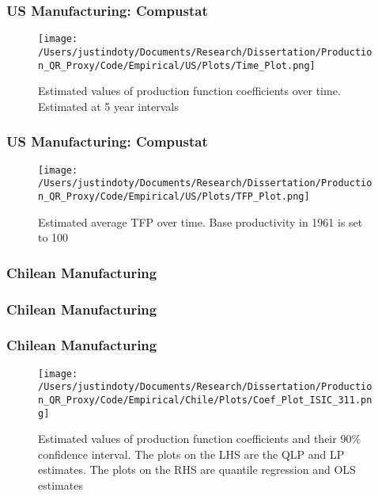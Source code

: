 \documentclass{beamer}
\begin{document}
\begin{frame}
\frametitle{US Manufacturing: Compustat}
\begin{figure}[ht]
\centering
\texttt{[image: /Users/justindoty/Documents/Research/Dissertation/Production\_QR\_Proxy/Code/Empirical/US/Plots/Time\_Plot.png]}
\caption{Estimated values of production function coefficients over time. Estimated at 5 year intervals}
\end{figure}
\end{frame}

\begin{frame}
\frametitle{US Manufacturing: Compustat}
\begin{figure}[ht]
\centering
\texttt{[image: /Users/justindoty/Documents/Research/Dissertation/Production\_QR\_Proxy/Code/Empirical/US/Plots/TFP\_Plot.png]}
\caption{Estimated average TFP over time. Base productivity in 1961 is set to 100}
\end{figure}
\end{frame}


\begin{frame}
\frametitle{Chilean Manufacturing}
\scriptsize

\end{frame}

\begin{frame}
\frametitle{Chilean Manufacturing}
\scriptsize

\end{frame}

\begin{frame}
\frametitle{Chilean Manufacturing}
\begin{figure}[ht]
\centering
\texttt{[image: /Users/justindoty/Documents/Research/Dissertation/Production\_QR\_Proxy/Code/Empirical/Chile/Plots/Coef\_Plot\_ISIC\_311.png]}
\caption{Estimated values of production function coefficients and their 90\% confidence interval. The plots on the LHS are the QLP and LP estimates. The plots on the RHS are quantile regression and OLS estimates}
\end{figure}
\end{frame}
\end{document}
